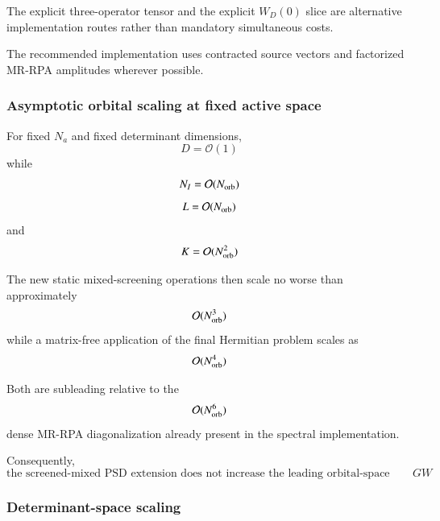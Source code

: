 \documentclass[aip,jcp,reprint,noshowkeys,superscriptaddress]{revtex4-1}
\begin{document}
The explicit three-operator tensor and the explicit $W_D(0)$ slice are
alternative implementation routes rather than mandatory simultaneous
costs.

The recommended implementation uses contracted source vectors and
factorized MR-RPA amplitudes wherever possible.


\subsubsection{Asymptotic orbital scaling at fixed active space}

For fixed $N_a$ and fixed determinant dimensions,
\begin{equation}
  D=\mathcal O(1)
\end{equation}
while
\begin{equation}
  N_I
  =
  \mathcal O(N_{\rm orb})
\end{equation}
\begin{equation}
  L
  =
  \mathcal O(N_{\rm orb})
\end{equation}
and
\begin{equation}
  K
  =
  \mathcal O(N_{\rm orb}^2)
\end{equation}

The new static mixed-screening operations then scale no worse than
approximately
\begin{equation}
  \mathcal O(N_{\rm orb}^3)
\end{equation}
while a matrix-free application of the final Hermitian problem scales
as
\begin{equation}
  \mathcal O(N_{\rm orb}^4)
\end{equation}

Both are subleading relative to the
\begin{equation}
  \mathcal O(N_{\rm orb}^6)
\end{equation}
dense MR-RPA diagonalization already present in the spectral
implementation.

Consequently,
\begin{equation}
  \text{the screened-mixed PSD extension does not increase the
  leading orbital-space scaling of dense spectral MR-}GW
  \label{eq:no-scaling-increase}
\end{equation}


\subsubsection{Determinant-space scaling}
\end{document}
